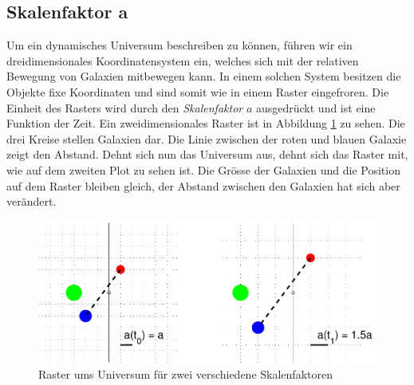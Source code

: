 \begin{refsection}
\section{Skalenfaktor a}
Um ein dynamisches Universum beschreiben zu können, führen wir ein dreidimensionales Koordinatensystem ein, welches sich mit der relativen Bewegung von Galaxien mitbewegen kann. In einem solchen System besitzen die Objekte fixe Koordinaten und sind somit wie in einem Raster eingefroren. Die Einheit des Rasters wird durch den {\em Skalenfaktor} $a$ ausgedrückt und ist eine Funktion der Zeit. Ein zweidimensionales Raster ist in Abbildung \ref{friedmann:friedmannRaster} zu sehen. Die drei Kreise stellen Galaxien dar. Die Linie zwischen der roten und blauen Galaxie zeigt den Abstand. Dehnt sich nun das Universum aus, dehnt sich das Raster mit, wie auf dem zweiten Plot zu sehen ist. Die Grösse der Galaxien und die Position auf dem Raster bleiben gleich, der Abstand zwischen den Galaxien hat sich aber verändert. 

\begin{figure}[h]
	\centering
	\includegraphics[width  = \textwidth]{friedmann/images/rasterFriedmann}
	\caption{Raster ums Universum für zwei verschiedene Skalenfaktoren}
	\label{friedmann:friedmannRaster}
\end{figure}%


\end{refsection}
